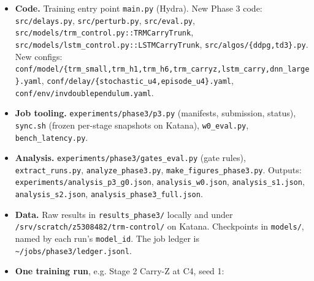 \documentclass[11pt]{article}
\begin{document}
\begin{itemize}
\item \textbf{Code.} Training entry point \texttt{main.py} (Hydra). New Phase 3 code: \texttt{src/delays.py}, \texttt{src/\allowbreak{}perturb.\allowbreak{}py}, \texttt{src/eval.py}, \texttt{src/\allowbreak{}models/\allowbreak{}trm\_\allowbreak{}control.\allowbreak{}py::TRMCarryTrunk}, \texttt{src/\allowbreak{}models/\allowbreak{}lstm\_\allowbreak{}control.\allowbreak{}py::LSTMCarryTrunk}, \texttt{src/\allowbreak{}algos/\allowbreak{}\{ddpg,\allowbreak{}td3\}.\allowbreak{}py}. New configs: \texttt{conf/\allowbreak{}model/\allowbreak{}\{trm\_\allowbreak{}small,\allowbreak{}trm\_\allowbreak{}h1,\allowbreak{}trm\_\allowbreak{}h6,\allowbreak{}trm\_\allowbreak{}carryz,\allowbreak{}lstm\_\allowbreak{}carry,\allowbreak{}dnn\_\allowbreak{}large\}.\allowbreak{}yaml}, \texttt{conf/\allowbreak{}delay/\allowbreak{}\{stochastic\_\allowbreak{}u4,\allowbreak{}episode\_\allowbreak{}u4\}.\allowbreak{}yaml}, \texttt{conf/\allowbreak{}env/\allowbreak{}invdoublependulum.\allowbreak{}yaml}.
\item \textbf{Job tooling.} \texttt{experiments/\allowbreak{}phase3/\allowbreak{}p3.\allowbreak{}py} (manifests, submission, status), \texttt{sync.sh} (frozen per-stage snapshots on Katana), \texttt{w0\_eval.py}, \texttt{bench\_\allowbreak{}latency.\allowbreak{}py}.
\item \textbf{Analysis.} \texttt{experiments/\allowbreak{}phase3/\allowbreak{}gates\_\allowbreak{}eval.\allowbreak{}py} (gate rules), \texttt{extract\_\allowbreak{}runs.\allowbreak{}py}, \texttt{analyze\_\allowbreak{}phase3.\allowbreak{}py}, \texttt{make\_\allowbreak{}figures\_\allowbreak{}phase3.\allowbreak{}py}. Outputs: \texttt{experiments/\allowbreak{}analysis\_\allowbreak{}p3\_\allowbreak{}g0.\allowbreak{}json}, \texttt{analysis\_\allowbreak{}w0.\allowbreak{}json}, \texttt{analysis\_\allowbreak{}s1.\allowbreak{}json}, \texttt{analysis\_\allowbreak{}s2.\allowbreak{}json}, \texttt{analysis\_\allowbreak{}phase3\_\allowbreak{}full.\allowbreak{}json}.
\item \textbf{Data.} Raw results in \texttt{results\_\allowbreak{}phase3/\allowbreak{}} locally and under \texttt{/\allowbreak{}srv/\allowbreak{}scratch/\allowbreak{}z5308482/\allowbreak{}trm-control/\allowbreak{}} on Katana. Checkpoints in \texttt{models/}, named by each run's \texttt{model\_id}. The job ledger is \texttt{\textasciitilde{}/\allowbreak{}jobs/\allowbreak{}phase3/\allowbreak{}ledger.\allowbreak{}jsonl}.
\item \textbf{One training run}, e.g. Stage 2 Carry-Z at C4, seed 1:
\end{itemize}
\end{document}
